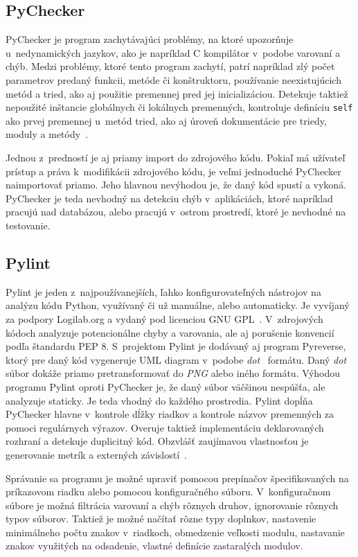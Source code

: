 \documentclass[11pt,oneside,final]{fithesis2}
\begin{document}
\subsection{PyChecker}

	PyChecker je program zachytávajúci problémy, na ktoré upozorňuje u~nedynamických jazykov, ako je napríklad C kompilátor v~podobe varovaní a chýb. Medzi problémy, ktoré tento program zachytí, patrí napríklad zlý počet parametrov predaný funkcii, metóde či konštruktoru, používanie neexistujúcich metód a tried, ako aj použitie premennej pred jej inicializáciou. Detekuje taktiež nepoužité inštancie globálnych či lokálnych premenných, kontroluje definíciu \texttt{self} ako prvej premennej u~metód tried, ako aj úroveň dokumentácie pre triedy, moduly a metódy~\cite{pychecker}. 
	
	Jednou z~predností je aj priamy import do zdrojového kódu. Pokiaľ má užívateľ prístup a práva k~modifikácii zdrojového kódu, je veľmi jednoduché PyChecker naimportovať priamo. Jeho hlavnou nevýhodou je, že daný kód spustí a vykoná. PyChecker je teda nevhodný na detekciu chýb v~aplikáciách, ktoré napríklad pracujú nad databázou, alebo pracujú v~ostrom prostredí, ktoré je nevhodné na testovanie.

\subsection{Pylint}
	Pylint je jeden z~najpoužívanejších, ľahko konfigurovateľných nástrojov na analýzu kódu Python, využívaný či už manuálne, alebo automaticky. Je vyvíjaný za podpory Logilab.org a vydaný pod licenciou GNU GPL~\cite{gnugpl}. V~zdrojových kódoch analyzuje potencionálne chyby a varovania, ale aj porušenie konvencií podľa štandardu PEP 8. S~projektom Pylint je dodávaný aj program Pyreverse, ktorý pre daný kód vygeneruje UML diagram v~podobe \textit{dot}~\cite{dotformat} formátu. Daný \textit{dot} súbor dokáže priamo pretransformovať do \textit{PNG} alebo iného formátu. Výhodou programu Pylint oproti PyChecker je, že daný súbor väčšinou nespúšťa, ale analyzuje staticky. Je teda vhodný do každého prostredia. Pylint dopĺňa PyChecker hlavne v~kontrole dĺžky riadkov a kontrole názvov premenných za pomoci regulárnych výrazov. Overuje taktiež implementáciu deklarovaných rozhraní a detekuje duplicitný kód.
    Obzvlášť zaujímavou vlastnosťou je generovanie metrík a externých závislostí~\cite{pylint}.

	Správanie sa programu je možné upraviť pomocou prepínačov špecifikovaných na príkazovom riadku alebo pomocou konfiguračného súboru. V~konfiguračnom súbore je možná filtrácia varovaní a chýb rôznych druhov, ignorovanie rôznych typov súborov. Taktiež je možné načítať rôzne typy doplnkov, nastavenie minimálneho počtu znakov v~riadkoch, obmedzenie veľkosti modulu, nastavanie znakov využitých na odsadenie, vlastné definície zastaralých modulov.
    
\end{document}
